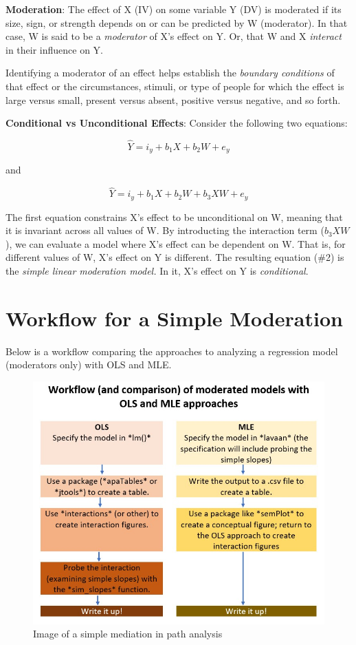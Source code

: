 \documentclass[
  english,
]{book}
\begin{document}
\textbf{Moderation}: The effect of X (IV) on some variable Y (DV) is moderated if its size, sign, or strength depends on or can be predicted by W (moderator). In that case, W is said to be a \emph{moderator} of X's effect on Y. Or, that W and X \emph{interact} in their influence on Y.

Identifying a moderator of an effect helps establish the \emph{boundary conditions} of that effect or the circumstances, stimuli, or type of people for which the effect is large versus small, present versus absent, positive versus negative, and so forth.

\textbf{Conditional vs Unconditional Effects}: Consider the following two equations:

\[\hat{Y} = i_{y}+b_{1}X + b_{2}W + e_{y}\]

and

\[\hat{Y} = i_{y}+b_{1}X + b_{2}W + b_{3}XW+ e_{y}\]

The first equation constrains X's effect to be unconditional on W, meaning that it is invariant across all values of W. By introducting the interaction term (\(b_{3}XW\)), we can evaluate a model where X's effect can be dependent on W. That is, for different values of W, X's effect on Y is different. The resulting equation (\#2) is the \emph{simple linear moderation model.} In it, X's effect on Y is \emph{conditional}.

\hypertarget{workflow-for-a-simple-moderation}{%
\section{Workflow for a Simple Moderation}\label{workflow-for-a-simple-moderation}}

Below is a workflow comparing the approaches to analyzing a regression model (moderators only) with OLS and MLE.

\begin{figure}
\centering
\includegraphics{images/SimpleMod/OLS_MLEwrkflow.jpg}
\caption{Image of a simple mediation in path analysis}
\end{figure}
\end{document}
